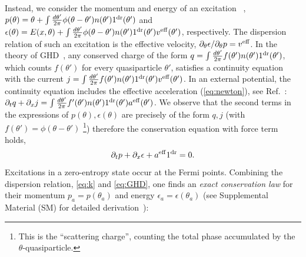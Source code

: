 \documentclass[twocolumn,amsfonts,showpacs,superscriptaddress]{revtex4-1}
\begin{document}
Instead, we consider the momentum and energy of an excitation%
~\cite{korepin1997quantum}, $p(\theta) = \theta + \int \frac{d\theta'}{2\pi} \phi(\theta-\theta') n(\theta')1^{\rm dr}(\theta')$ and $\epsilon(\theta) = E(x,\theta) + \int \frac{d\theta'}{2\pi} \phi(\theta-\theta')n(\theta')1^{\rm dr}(\theta')v^{\rm eff}(\theta')$, respectively. The dispersion relation of such an excitation is the effective velocity, $\partial_\theta \epsilon/ \partial_\theta p = v^{\rm eff}$. In the theory of GHD~\cite{bertini2016transport,castro2016emergent}, any conserved charge of the form $q = \int \frac{d \theta'}{2\pi} f(\theta') n(\theta')1^{\rm dr} (\theta')$, which counts $f(\theta')$ for every quasiparticle $\theta'$, satisfies a continuity equation with the current $j =\int \frac{d \theta'}{2\pi} f(\theta') n(\theta') 1^{\rm dr} (\theta') v^{\rm eff}(\theta')$. In an external potential, the continuity equation includes the effective acceleration (\ref{eq:newton}), see Ref.~\cite{doyon2017note}: $\partial_t q + \partial_x j =  \int \frac{d \theta'}{2\pi} f'(\theta') n(\theta') 1^{\rm dr} (\theta') a^{\rm eff}(\theta')$. We observe that the second terms in the expressions of $p(\theta), \epsilon(\theta)$ are precisely of the form $q, j$ (with $f(\theta') = \phi(\theta-\theta')$ \footnote{This is the ``scattering charge'', counting the total phase accumulated by the $\theta$-quasiparticle.}) therefore the conservation equation with force term holds,
\begin{equation}\label{eq:k}
	\partial_t p + \partial_x \epsilon + a^{\rm eff} 1^{\rm dr} = 0.
\end{equation}
Excitations in a zero-entropy state occur at the Fermi points. Combining the dispersion relation, \eqref{eq:k} and \eqref{eq:GHD}, one finds an {\em exact conservation law} for their momentum $p_a = p(\theta_a)$  and energy $\epsilon_a = \epsilon(\theta_a)$ (see Supplemental Material (SM) for detailed derivation~\cite{SM}):
\end{document}

